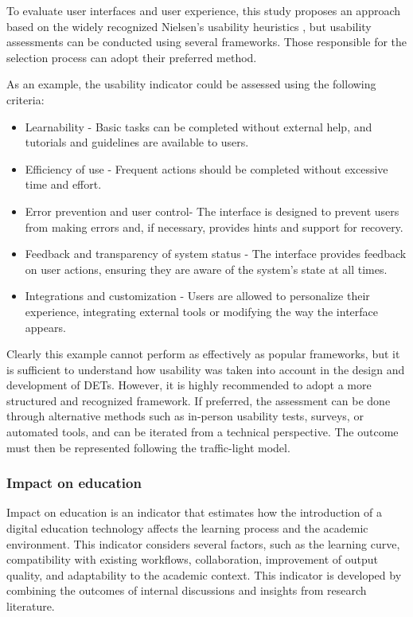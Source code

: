 To evaluate user interfaces and user experience, this study proposes an approach based on the widely recognized Nielsen's usability heuristics \cite{nielsen_enhancing_1994}, but usability assessments can be conducted using several frameworks. Those responsible for the selection process can adopt their preferred method. 

As an example, the usability indicator could be assessed using the following criteria:
\begin{itemize}[noitemsep, topsep=4pt, parsep=0pt, partopsep=0pt]
    \item Learnability - Basic tasks can be completed without external help, and tutorials and guidelines are available to users.
    \item Efficiency of use - Frequent actions should be completed without excessive time and effort.
    \item Error prevention and user control- The interface is designed to prevent users from making errors and, if necessary, provides hints and support for recovery. 
    \item Feedback and transparency of system status - The interface provides feedback on user actions, ensuring they are aware of the system's state at all times.
    \item Integrations and customization - Users are allowed to personalize their experience, integrating external tools or modifying the way the interface appears.
\end{itemize}

\noindent
Clearly this example cannot perform as effectively as popular frameworks, but it is sufficient to understand how usability was taken into account in the design and development of DETs. However, it is highly recommended to adopt a more structured and recognized framework.  
If preferred, the assessment can be done through alternative methods such as in-person usability tests, surveys, or automated tools, and can be iterated from a technical perspective.
The outcome must then be represented following the traffic-light model.

\subsubsection{Impact on education}
Impact on education is an indicator that estimates how the introduction of a digital education technology affects the learning process and the academic environment. This indicator considers several factors, such as the learning curve, compatibility with existing workflows, collaboration, improvement of output quality, and adaptability to the academic context. This indicator is developed by combining the outcomes of internal discussions and insights from research literature.

